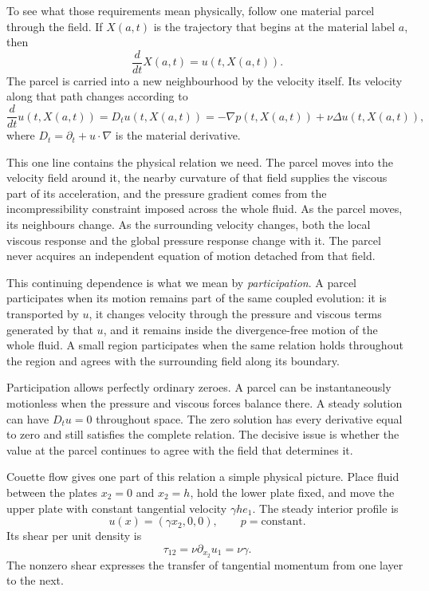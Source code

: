 
To see what those requirements mean physically, follow one material parcel through the field.
If \(X(a,t)\) is the trajectory that begins at the material label \(a\), then
\[
  \frac{d}{dt}X(a,t)=u(t,X(a,t)).
\]
The parcel is carried into a new neighbourhood by the velocity itself.
Its velocity along that path changes according to
\[
  \frac{d}{dt}u(t,X(a,t))
  =
  D_tu(t,X(a,t))
  =
  -\nabla p(t,X(a,t))
  +\nu\Delta u(t,X(a,t)),
\]
where \(D_t=\partial_t+u\cdot\nabla\) is the material derivative.

This one line contains the physical relation we need.
The parcel moves into the velocity field around it, the nearby curvature of that field supplies the viscous part of its acceleration, and the pressure gradient comes from the incompressibility constraint imposed across the whole fluid.
As the parcel moves, its neighbours change.
As the surrounding velocity changes, both the local viscous response and the global pressure response change with it.
The parcel never acquires an independent equation of motion detached from that field.

This continuing dependence is what we mean by \emph{participation}.
A parcel participates when its motion remains part of the same coupled evolution: it is transported by \(u\), it changes velocity through the pressure and viscous terms generated by that \(u\), and it remains inside the divergence-free motion of the whole fluid.
A small region participates when the same relation holds throughout the region and agrees with the surrounding field along its boundary.

Participation allows perfectly ordinary zeroes.
A parcel can be instantaneously motionless when the pressure and viscous forces balance there.
A steady solution can have \(D_tu=0\) throughout space.
The zero solution has every derivative equal to zero and still satisfies the complete relation.
The decisive issue is whether the value at the parcel continues to agree with the field that determines it.

Couette flow gives one part of this relation a simple physical picture.
Place fluid between the plates \(x_2=0\) and \(x_2=h\), hold the lower plate fixed, and move the upper plate with constant tangential velocity \(\gamma h e_1\).
The steady interior profile is
\[
  u(x)=(\gamma x_2,0,0),
  \qquad
  p=\text{constant}.
\]
Its shear per unit density is
\[
  \tau_{12}=\nu\partial_{x_2}u_1=\nu\gamma.
\]
The nonzero shear expresses the transfer of tangential momentum from one layer to the next.

